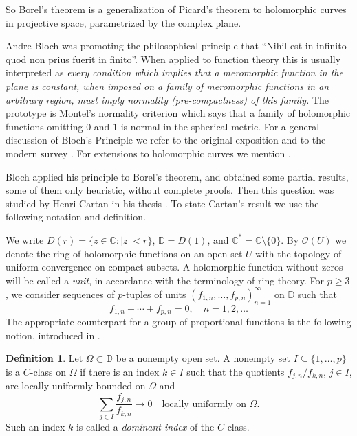 \documentclass[12pt,letterpaper,reqno]{amsart}
\theoremstyle{definition}
\newtheorem{defin}[thm]{Definition}
\numberwithin{equation}{section}
\newcommand{\D}{\mathbb D}
\newcommand{\C}{\mathbb C}
\newcommand{\OO}{\mathcal O}
\begin{document}
	So Borel's theorem is a generalization of Picard's theorem to
	holomorphic curves in projective space, parametrized by the complex plane.
	
	Andre Bloch was promoting the philosophical principle that ``Nihil est
	in infinito quod non prius fuerit in finito''. When applied to function
	theory this is usually interpreted as {\em every condition which implies
		that a meromorphic function in the plane is constant, when imposed on
		a family of meromorphic functions in an arbitrary region, must imply
		normality (pre-compactness) of this family.} The prototype is Montel's
	normality criterion \cite{Mo27} which says that a family of holomorphic functions
	omitting $0$ and $1$ is normal in the spherical metric.
	For a general discussion of Bloch's Principle
	we refer to the original exposition \cite{Blo26a} and to
	the modern survey  \cite{Ber06}. For extensions to holomorphic curves we mention
	\cite{Yam26}.
	
	Bloch \cite{Blo26} applied his principle to Borel's theorem, and obtained some
	partial results, some of them only heuristic, without complete proofs.
	Then this question was studied by
	Henri Cartan in his thesis \cite{Car28}. To state Cartan's result we use the
	following notation and definition.
	
	We write $D(r)=\{z\in\C:|z|<r\}$, $\D=D(1)$, and
	$\C^*=\C\setminus\{0\}$.
	By $\OO(U)$ we denote the ring of holomorphic functions on an open set $U$
	with the topology of uniform convergence on compact subsets.
	A holomorphic function without zeros will be called a \emph{unit},
	in accordance with the terminology of ring theory.
	For $p\geq 3$, we consider sequences of $p$-tuples of
	units $(f_{1,n},\ldots,f_{p,n})_{n=1}^\infty$
	on $\D$ such that
	\begin{equation}\label{eq:zero-sum}
		f_{1,n}+\cdots+f_{p,n}=0,\quad n=1,2,\ldots
	\end{equation}
	The appropriate counterpart for a group of proportional
	functions is the following
	notion, introduced in \cite{Ere96b}.
	
	\begin{defin}\label{def:cclass}
		Let $\Omega\subset\D$ be a nonempty open set. A nonempty set
		$I\subseteq\{1,\ldots,p\}$ is a $C$-class on $\Omega$ if there is an
		index $k\in I$ such that the quotients $f_{j,n}/f_{k,n}$, $j\in I$,
		are locally uniformly bounded on $\Omega$ and
		\begin{equation}\label{cclass}
			\sum_{j\in I}\frac{f_{j,n}}{f_{k,n}}\longrightarrow0
			\quad\text{locally uniformly on }\Omega.
		\end{equation}
		Such an index $k$ is called a \emph{dominant index} of the $C$-class.
	\end{defin}
	
\end{document}
